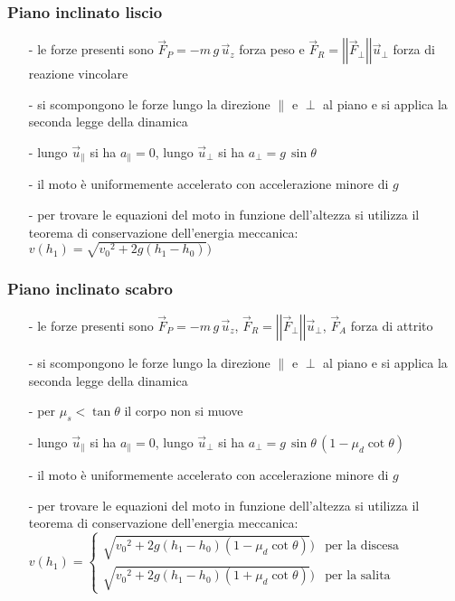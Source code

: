 \documentclass[a4paper]{article}
\newcommand\uz{\vec{u}_z}
\newcommand\vmod[1]{\left|\left|{#1}\right|\right|}
\begin{document}
\subsubsection*{Piano inclinato liscio}
\begin{itemize}[topsep=3pt, itemsep=0pt]
	\item[-] le forze presenti sono \(\vec{F}_P = -m \, g \, \uz\) forza peso e \(\vec{F}_R = \vmod{\vec{F}_\perp} \vec{u}_\perp\) forza di reazione vincolare
	\item[-] si scompongono le forze lungo la direzione \(\parallel\) e \(\perp\) al piano e si applica la seconda legge della dinamica
	\item[-] lungo \(\vec{u}_\parallel\) si ha \(a_\parallel = 0\), lungo \(\vec{u}_\perp\) si ha \(a_\perp = g \, \sin \theta\)
	\item[-] il moto è uniformemente accelerato con accelerazione minore di \(g\)
	\item[-] per trovare le equazioni del moto in funzione dell'altezza si utilizza il teorema di conservazione dell'energia meccanica:
	\(v(h_1) = \sqrt{{v_0}^2 + 2g(h_1 - h_0)})\)
\end{itemize}

\subsubsection*{Piano inclinato scabro}
\begin{itemize}[topsep=3pt, itemsep=0pt]
	\item[-] le forze presenti sono \(\vec{F}_P = -m \, g \, \uz\), \(\vec{F}_R = \vmod{\vec{F}_\perp} \vec{u}_\perp\), \(\vec{F}_A\) forza di attrito
	\item[-] si scompongono le forze lungo la direzione \(\parallel\) e \(\perp\) al piano e si applica la seconda legge della dinamica
	\item[-] per \(\mu_s < \tan \theta\) il corpo non si muove
	\item[-] lungo \(\vec{u}_\parallel\) si ha \(a_\parallel = 0\), lungo \(\vec{u}_\perp\) si ha \(a_\perp = g \, \sin \theta \, (1-\mu_d \cot \theta)\)
	\item[-] il moto è uniformemente accelerato con accelerazione minore di \(g\)
	\item[-] per trovare le equazioni del moto in funzione dell'altezza si utilizza il teorema di conservazione dell'energia meccanica:
	\(v(h_1) = \begin{cases}
		\sqrt{{v_0}^2 + 2g(h_1 - h_0)(1-\mu_d \cot \theta)}) &\text{per la discesa} \\
		\sqrt{{v_0}^2 + 2g(h_1 - h_0)(1+\mu_d \cot \theta)}) &\text{per la salita}
	\end{cases}\)
\end{itemize}
\end{document}
